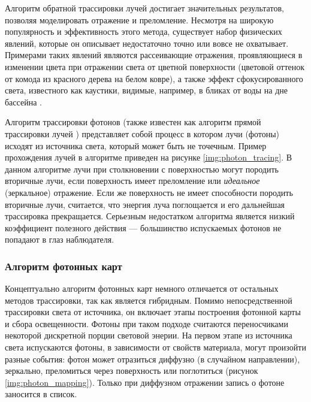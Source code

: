 Алгоритм обратной трассировки лучей достигает значительных результатов, позволяя моделировать отражение и преломление. Несмотря на широкую популярность и эффективность этого метода, существует набор физических явлений, которые он описывает недостаточно точно или вовсе не охватывает. Примерами таких явлений являются рассеивающие отражения, проявляющиеся в изменении цвета при отражении света от цветной поверхности (цветовой оттенок от комода из красного дерева на белом ковре), а также эффект сфокусированного света, известного как каустики, видимые, например, в бликах от воды на дне бассейна \cite{mezhenin_3d}.

Алгоритм трассировки фотонов \cite{kalos_phd} (также известен как алгоритм прямой трассировки лучей \cite{jensen_gi}) представляет собой процесс в котором лучи (фотоны) исходят из источника света, который может быть не точечным.  Пример прохождения лучей в алгоритме приведен на рисунке \ref{img:photon_tracing}. В данном алгоритме лучи при столкновении с поверхностью могут породить вторичные лучи, если поверхность имеет преломление или \textit{идеальное} (зеркальное) отражение. Если же поверхность не имеет способности породить вторичные лучи, считается, что энергия луча поглощается и его дальнейшая трассировка прекращается. Серьезным недостатком алгоритма является низкий коэффициент полезного действия --- большинство испускаемых фотонов не попадают в глаз наблюдателя.


\subsubsection{Алгоритм фотонных карт}

Концептуально алгоритм фотонных карт \cite{jensen_gi} немного отличается от остальных методов трассировки, так как является гибридным. Помимо непосредственной трассировки света от источника, он включает этапы построения фотонной карты и сбора освещенности. Фотоны при таком подходе считаются переносчиками некоторой дискретной порции световой энерии. На первом этапе из источника света испускаются фотоны, в зависимости от свойств материала, могут произойти разные события: фотон может отразиться диффузно (в случайном направлении), зеркально, преломиться через поверхность или поглотиться (рисунок \ref{img:photon_mapping}). Только при диффузном отражении запись о фотоне заносится в список.


